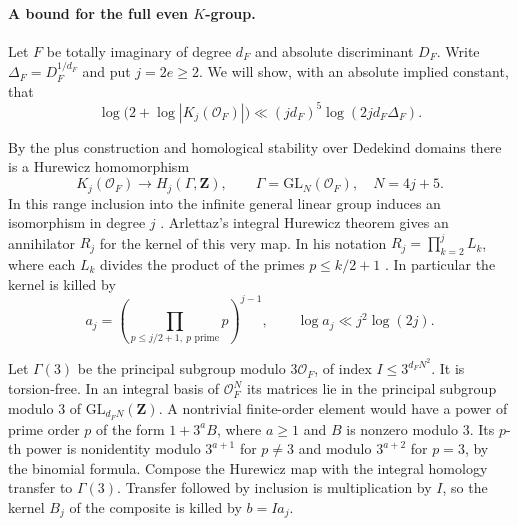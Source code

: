 \paragraph{A bound for the full even \(K\)-group.}
%
Let \(F\) be totally imaginary of degree \(d_F\) and absolute
discriminant \(D_F\). Write \(\Delta_F=D_F^{1/d_F}\) and put
\(j=2e\ge2\). We will show, with an absolute implied constant, that
\begin{equation}
\label{eq:family-even-k-group}
 \log\bigl(2+\log|K_j(\mathcal O_F)|\bigr)
    \ll (jd_F)^5\log(2jd_F\Delta_F).
\end{equation}

By the plus construction and homological stability over Dedekind
domains there is a Hurewicz homomorphism
\[
 K_j(\mathcal O_F)\longrightarrow H_j(\Gamma,\mathbf Z),
 \qquad \Gamma=\mathrm{GL}_N(\mathcal O_F),\quad N=4j+5 .
\]
In this range inclusion into the infinite general linear group
induces an isomorphism in degree \(j\)
\cite[Theorem~3.1(i)]{f1charney-dedekind-stability}.
Arlettaz's integral Hurewicz theorem gives an annihilator \(R_j\)
for the kernel of this very map. In his notation
\(R_j=\prod_{k=2}^j L_k\), where each \(L_k\) divides the product of
the primes \(p\le k/2+1\)
\cite[Definitions~7.11 and~7.14, Corollary~7.19(a)]{f1arlettaz-k-theory}.
In particular the kernel is killed by
\[
 a_j=\left(\prod_{p\le j/2+1,\ p\text{ prime}}p\right)^{j-1},
 \qquad \log a_j\ll j^2\log(2j).
\]

Let \(\Gamma(3)\) be the principal subgroup modulo \(3\mathcal O_F\),
of index \(I\le3^{d_FN^2}\). It is torsion-free. In an integral basis
of \(\mathcal O_F^N\) its matrices lie in the principal subgroup
modulo \(3\) of \(\mathrm{GL}_{d_FN}(\mathbf Z)\).
A nontrivial finite-order element would have a power of prime
order \(p\) of the form \(1+3^aB\), where \(a\ge1\) and \(B\) is
nonzero modulo \(3\). Its \(p\)-th power is nonidentity modulo
\(3^{a+1}\) for \(p\ne3\) and modulo \(3^{a+2}\) for \(p=3\), by
the binomial formula. Compose the Hurewicz map with the integral
homology transfer to \(\Gamma(3)\). Transfer followed by inclusion
is multiplication by \(I\), so the kernel \(B_j\) of the composite
is killed by \(b=Ia_j\).

